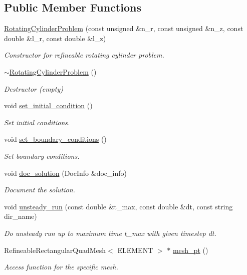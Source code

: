 \subsection*{Public Member Functions}
\begin{DoxyCompactItemize}
\item 
\hyperlink{classRotatingCylinderProblem_a436b0ff8c4ac33acfe10492c587ad80d}{Rotating\+Cylinder\+Problem} (const unsigned \&n\+\_\+r, const unsigned \&n\+\_\+z, const double \&l\+\_\+r, const double \&l\+\_\+z)
\begin{DoxyCompactList}\small\item\em Constructor for refineable rotating cylinder problem. \end{DoxyCompactList}\item 
\hyperlink{classRotatingCylinderProblem_a586e71f48ee21cfc3bc93d17e91bbc11}{$\sim$\+Rotating\+Cylinder\+Problem} ()
\begin{DoxyCompactList}\small\item\em Destructor (empty) \end{DoxyCompactList}\item 
void \hyperlink{classRotatingCylinderProblem_a5e4316cce2306c4aab4a20b88cdfe6e3}{set\+\_\+initial\+\_\+condition} ()
\begin{DoxyCompactList}\small\item\em Set initial conditions. \end{DoxyCompactList}\item 
void \hyperlink{classRotatingCylinderProblem_a37efdb2d7059535a48b12f69869996ee}{set\+\_\+boundary\+\_\+conditions} ()
\begin{DoxyCompactList}\small\item\em Set boundary conditions. \end{DoxyCompactList}\item 
void \hyperlink{classRotatingCylinderProblem_a22f82fba41d68b9748642f9a29a12592}{doc\+\_\+solution} (Doc\+Info \&doc\+\_\+info)
\begin{DoxyCompactList}\small\item\em Document the solution. \end{DoxyCompactList}\item 
void \hyperlink{classRotatingCylinderProblem_abfb7f77b97e9ac061edbaa97a018cd24}{unsteady\+\_\+run} (const double \&t\+\_\+max, const double \&dt, const string dir\+\_\+name)
\begin{DoxyCompactList}\small\item\em Do unsteady run up to maximum time t\+\_\+max with given timestep dt. \end{DoxyCompactList}\item 
Refineable\+Rectangular\+Quad\+Mesh$<$ E\+L\+E\+M\+E\+NT $>$ $\ast$ \hyperlink{classRotatingCylinderProblem_a49ac12439c31baa10b6a014a8161f78e}{mesh\+\_\+pt} ()
\begin{DoxyCompactList}\small\item\em Access function for the specific mesh. \end{DoxyCompactList}\end{DoxyCompactItemize}
